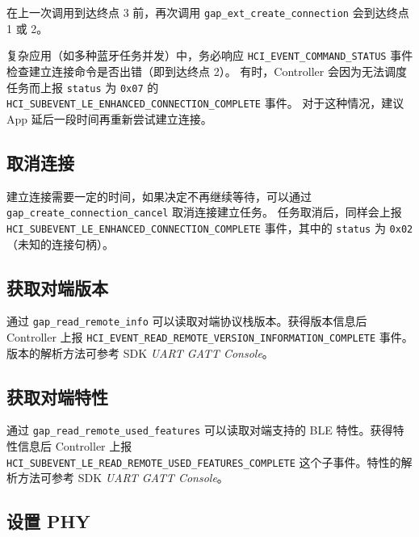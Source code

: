 \documentclass[
  12pt,
]{book}
\makeatletter
\newenvironment{kframe}{%
\medskip{}
\setlength{\fboxsep}{.8em}
 \def\at@end@of@kframe{}%
 \ifinner\ifhmode%
  \def\at@end@of@kframe{\end{minipage}}%
  \begin{minipage}{\columnwidth}%
 \fi\fi%
 \def\FrameCommand##1{\hskip\@totalleftmargin \hskip-\fboxsep
 \colorbox{shadecolor}{##1}\hskip-\fboxsep
     \hskip-\linewidth \hskip-\@totalleftmargin \hskip\columnwidth}%
 \MakeFramed {\advance\hsize-\width
   \@totalleftmargin\z@ \linewidth\hsize
   \@setminipage}}%
 {\par\unskip\endMakeFramed%
 \at@end@of@kframe}
\newenvironment{rmdblock}[1]
  {
  \begin{itemize}
  \renewcommand{\labelitemi}{
    \raisebox{-.7\height}[0pt][0pt]{
      {\setkeys{Gin}{width=3em,keepaspectratio}\texttt{[image: images/\#1]}}
    }
  }
  \setlength{\fboxsep}{1em}
  \begin{kframe}
  \item
  }
  {
  \end{kframe}
  \end{itemize}
  }
\newenvironment{rmdcaution}
  {\begin{rmdblock}{caution}}
  {\end{rmdblock}}
\makeatother
\begin{document}
在上一次调用到达终点 3 前，再次调用 \texttt{gap\_ext\_create\_connection} 会到达终点 1 或 2。

\begin{rmdcaution}
复杂应用（如多种蓝牙任务并发）中，务必响应
\texttt{HCI\_EVENT\_COMMAND\_STATUS}
事件检查建立连接命令是否出错（即到达终点 2）。 有时，Controller
会因为无法调度任务而上报 \texttt{status} 为 \texttt{0x07} 的
\texttt{HCI\_SUBEVENT\_LE\_ENHANCED\_CONNECTION\_COMPLETE} 事件。
对于这种情况，建议 App 延后一段时间再重新尝试建立连接。
\end{rmdcaution}

\hypertarget{ux53d6ux6d88ux8fdeux63a5}{%
\subsection{取消连接}\label{ux53d6ux6d88ux8fdeux63a5}}

建立连接需要一定的时间，如果决定不再继续等待，可以通过 \texttt{gap\_create\_connection\_cancel} 取消连接建立任务。
任务取消后，同样会上报 \texttt{HCI\_SUBEVENT\_LE\_ENHANCED\_CONNECTION\_COMPLETE} 事件，其中的 \texttt{status} 为 \texttt{0x02}
（未知的连接句柄）。

\hypertarget{ux83b7ux53d6ux5bf9ux7aefux7248ux672c}{%
\subsection{获取对端版本}\label{ux83b7ux53d6ux5bf9ux7aefux7248ux672c}}

通过 \texttt{gap\_read\_remote\_info} 可以读取对端协议栈版本。获得版本信息后 Controller 上报 \texttt{HCI\_EVENT\_READ\_REMOTE\_VERSION\_INFORMATION\_COMPLETE}
事件。版本的解析方法可参考 SDK \emph{UART GATT Console}。

\hypertarget{ux83b7ux53d6ux5bf9ux7aefux7279ux6027}{%
\subsection{获取对端特性}\label{ux83b7ux53d6ux5bf9ux7aefux7279ux6027}}

通过 \texttt{gap\_read\_remote\_used\_features} 可以读取对端支持的 BLE 特性。获得特性信息后 Controller 上报 \texttt{HCI\_SUBEVENT\_LE\_READ\_REMOTE\_USED\_FEATURES\_COMPLETE}
这个子事件。特性的解析方法可参考 SDK \emph{UART GATT Console}。

\hypertarget{ux8bbeux7f6e-phy}{%
\subsection{设置 PHY}\label{ux8bbeux7f6e-phy}}
\end{document}
